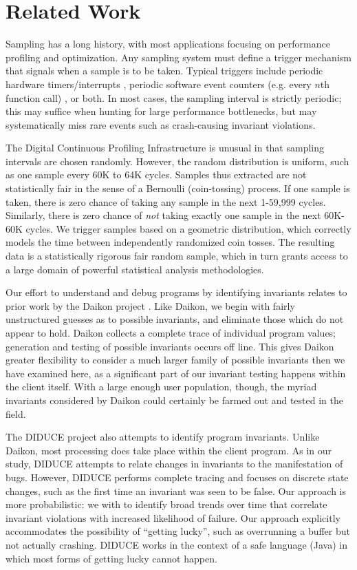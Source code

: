 \section{Related Work}
\label{sec:related-work}

Sampling has a long history, with most applications focusing on
performance profiling and optimization.  Any sampling system must
define a trigger mechanism that signals when a sample is to be taken.
Typical triggers include periodic hardware timers/interrupts
\cite{Burrows:2000:EFV,Traub:200:EILPP,Whaley:337483}, periodic
software event counters (e.g.  every $n$th function call)
\cite{Arnold:2000:ACCTS}, or both.  In most cases, the sampling
interval is strictly periodic; this may suffice when hunting for large
performance bottlenecks, but may systematically miss rare events such
as crash-causing invariant violations.

The Digital Continuous Profiling Infrastructure
\cite{Anderson:1997:CPW} is unusual in that sampling intervals are
chosen randomly.  However, the random distribution is uniform, such as
one sample every 60K to 64K cycles.  Samples thus extracted are not
statistically fair in the sense of a Bernoulli (coin-tossing) process.
If one sample is taken, there is zero chance of taking any sample in
the next 1-59,999 cycles.  Similarly, there is zero chance of
\emph{not} taking exactly one sample in the next 60K-60K cycles.  We
trigger samples based on a geometric distribution, which correctly
models the time between independently randomized coin tosses.  The
resulting data is a statistically rigorous fair random sample, which
in turn grants access to a large domain of powerful statistical
analysis methodologies.

Our effort to understand and debug programs by identifying invariants
relates to prior work by the Daikon project \cite{ernst2001}.  Like
Daikon, we begin with fairly unstructured guesses as to possible
invariants, and eliminate those which do not appear to hold.  Daikon
collects a complete trace of individual program values; generation and
testing of possible invariants occurs off line.  This gives Daikon
greater flexibility to consider a much larger family of possible
invariants then we have examined here, as a significant part of our
invariant testing happens within the client itself.  With a large
enough user population, though, the myriad invariants considered by
Daikon could certainly be farmed out and tested in the field.

The DIDUCE project \cite{Hangal:DIDUCE:2002} also attempts to identify
program invariants.  Unlike Daikon, most processing does take place
within the client program.  As in our study, DIDUCE attempts to relate
changes in invariants to the manifestation of bugs.  However, DIDUCE
performs complete tracing and focuses on discrete state changes, such
as the first time an invariant was seen to be false.  Our approach is
more probabilistic: we with to identify broad trends over time that
correlate invariant violations with increased likelihood of failure.
Our approach explicitly accommodates the possibility of ``getting
lucky'', such as overrunning a buffer but not actually crashing.
DIDUCE works in the context of a safe language (Java) in which most
forms of getting lucky cannot happen.


